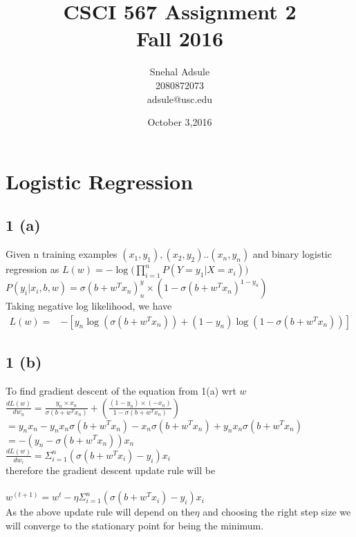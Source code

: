 \documentclass[10pt,letterpaper]{article}
\begin{document}
\title{CSCI 567 Assignment 2 \\Fall 2016}
\date{ October 3,2016}
\author{Snehal Adsule\\2080872073\\adsule@usc.edu}
\maketitle

\newpage
\section{Logistic Regression }
\subsection{1 (a)}
Given n training examples $(x_1,y_1),(x_2,y_2) .. (x_n,y_n)$ and binary logistic regression as
	$L(w)=-\log\big(\prod_{i=1}^n P(Y=y_1|X=x_i)\big)$\\
$P(y_i|x_i,b,w)=\sigma(b+w^T x_n)^y_n \times (1- \sigma(b+w^T x_n)^{1-y_n}) $\\

Taking negative log likelihood, we have 
\begin{align*}
L(w)=&-[y_n \log(\sigma(b+w^T x_n)) +(1- y_n)\log (1- \sigma(b+w^T x_n))]\tag{1}
\end{align*}

\subsection{1 (b)}
To find gradient descent of the equation from 1(a) wrt $w$\\

$\frac{dL(w)}{dw_n}=\frac{y_n\times x_n}{\sigma(b+w^T x_n)} + (\frac{(1- y_n) \times (-x_n)}{1-\sigma(b+w^T x_n)})$\\
$=y_n x_n -y_n x_n \sigma(b+w^T x_n) -x_n \sigma(b+w^T x_n) +y_n x_n \sigma(b+w^T x_n)$\\
$=-(y_n - \sigma(b+w^T x_n))x_n$\\
$\frac {dL(w)}{dw_i}= \Sigma_{i=1}^n ( \sigma(b+w^T x_i) - y_i )x_i $\\
therefore the gradient descent update rule will be \\\\
$w^{(t+1)}=w^t - \eta \Sigma_{i=1}^n ( \sigma(b+w^T x_i) - y_i )x_i$\\

As the above update rule will depend on the$ \eta$ and choosing the right step size we will converge to the stationary point for being the minimum.
\end{document}
